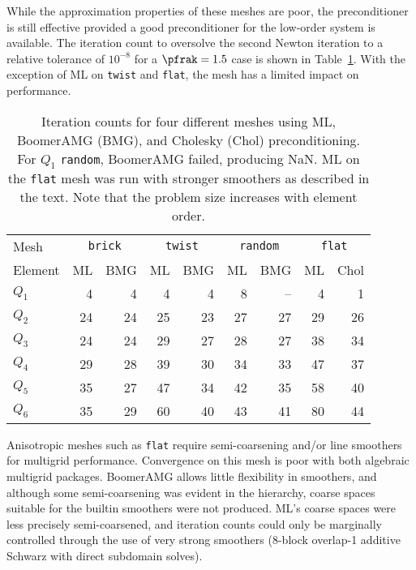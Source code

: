 While the approximation properties of these meshes are poor, the preconditioner is still effective provided a good
preconditioner for the low-order system is available.  The iteration count to oversolve the second Newton iteration to a
relative tolerance of $10^{-8}$ for a $\pfrak=1.5$ case is shown in Table~\ref{tab:quality}.  With the exception of ML
on \texttt{twist} and \texttt{flat}, the mesh has a limited impact on performance.

\begin{table}
  \centering
  \begin{tabular}{l rr rr rr rr}
    \toprule
    Mesh & \multicolumn{2}{c}{\texttt{brick}}
    & \multicolumn{2}{c}{\texttt{twist}}
    & \multicolumn{2}{c}{\texttt{random}}
    & \multicolumn{2}{c}{\texttt{flat}} \\
    \cmidrule(r){1-1} \cmidrule(rl){2-3} \cmidrule(rl){4-5} \cmidrule(rl){6-7} \cmidrule(l){8-9}
    Element & ML & BMG & ML & BMG & ML & BMG & ML & Chol \\
    \midrule
    $Q_1$ & 4&4  & 4&4   & 8&--   & 4&1 \\
    $Q_2$ & 24&24 & 25&23 & 27&27 & 29&26 \\
    $Q_3$ & 24&24 & 29&27 & 28&27 & 38&34 \\
    $Q_4$ & 29&28 & 39&30 & 34&33 & 47&37 \\
    $Q_5$ & 35&27 & 47&34 & 42&35 & 58&40 \\
    $Q_6$ & 35&29 & 60&40 & 43&41 & 80&44 \\
    \bottomrule
  \end{tabular}
  \caption{Iteration counts for four different meshes using ML, BoomerAMG (BMG), and Cholesky (Chol) preconditioning.
    For $Q_1$ \texttt{random}, BoomerAMG failed, producing NaN.  ML on the \texttt{flat} mesh was run with stronger
    smoothers as described in the text.  Note that the problem size increases with element order.}
  \label{tab:quality}
\end{table}

Anisotropic meshes such as \texttt{flat} require semi-coarsening and/or line smoothers for multigrid performance.
Convergence on this mesh is poor with both algebraic multigrid packages.  BoomerAMG allows little flexibility in
smoothers, and although some semi-coarsening was evident in the hierarchy, coarse spaces suitable for the builtin
smoothers were not produced.  ML's coarse spaces were less precisely semi-coarsened, and iteration counts could only be
marginally controlled through the use of very strong smoothers (8-block overlap-1 additive Schwarz with direct subdomain
solves).

